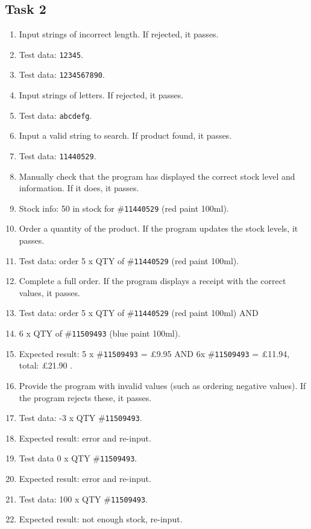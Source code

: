 \documentclass[a4paper]{article}
\begin{document}
\subsection{Task 2}
\begin{enumerate}
\item{Input strings of incorrect length. If rejected, it passes.}
\item[~]{Test data: \verb|12345|.}
\item[~]{Test data: \verb|1234567890|.}
\item{Input strings of letters. If rejected, it passes.}
\item[~]{Test data: \verb|abcdefg|.}
\item{Input a valid string to search. If product found, it passes.}
\item[~]{Test data: \verb|11440529|.}
\item{Manually check that the program has displayed the correct stock level and information. If it does, it passes.}
\item[~]{Stock info: 50 in stock for \#\verb|11440529| (red paint 100ml).}
\item{Order a quantity of the product. If the program updates the stock levels, it passes.}
\item[~]{Test data: order 5 x QTY of \#\verb|11440529| (red paint 100ml).}
\item{Complete a full order. If the program displays a receipt with the correct values, it passes.}
\item[~]{Test data: order 5 x QTY of \#\verb|11440529| (red paint 100ml) AND}
\item[~]{6 x QTY of \#\verb|11509493| (blue paint 100ml).}
\item[~]{Expected result: 5 x \#\verb|11509493| = \pounds9.95 AND 6x \#\verb|11509493| = \pounds11.94, total:  \pounds21.90 .}
\item{Provide the program with invalid values (such as ordering negative values). If the program rejects these, it passes.}
\item[~]{Test data: -3 x QTY \#\verb|11509493|.}
\item[~]{Expected result: error and re-input.}
\item[~]{Test data 0 x QTY \#\verb|11509493|.}
\item[~]{Expected result: error and re-input.}
\item[~]{Test data: 100 x QTY \#\verb|11509493|.}
\item[~]{Expected result: not enough stock, re-input.}
\end{enumerate}
\end{document}
